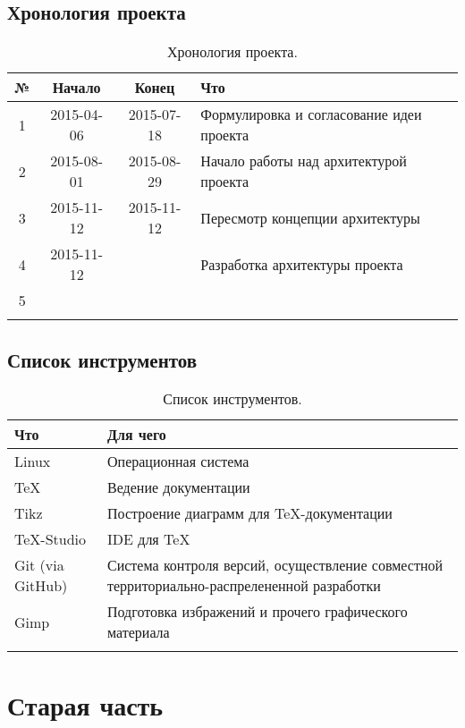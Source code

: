 \documentclass[12pt,a4paper,fullpage,titlepage]{article}
\begin{document}
\subsection{Хронология проекта}
\begin{table}[h]
\begin{tabularx}{\textwidth}{|c|c|c|X|}
	\hline
	№ & Начало & Конец & Что\\
	\hline
	1 & 2015-04-06 & 2015-07-18 & Формулировка и согласование идеи проекта \\
	\hline
	2 & 2015-08-01 & 2015-08-29 & Начало работы над архитектурой проекта \\
	\hline
	3 & 2015-11-12 & 2015-11-12 & Пересмотр концепции архитектуры \\
	\hline
	4 & 2015-11-12 &  & Разработка архитектуры проекта\\
	\hline
	5 &  &  &  \\
	\hline
	&  &  &  \\
	\hline
\end{tabularx}
\caption{Хронология проекта.}
\end{table}

\subsection{Список инструментов}
\begin{table}[h]
	\begin{tabularx}{\textwidth}{|l|X|}
		\hline
		Что & Для чего \\
		\hline
		Linux & Операционная система\\
		\hline
		\TeX & Ведение документации\\
		\hline
		Tikz & Построение диаграмм для \TeX-документации\\
		\hline
		\TeX-Studio & IDE для \TeX \\
		\hline
		Git (via GitHub) & Система контроля версий, осуществление совместной территориально-распрелененной разработки \\
		\hline
		Gimp & Подготовка избражений и прочего графического материала \\
		\hline
		& \\
		\hline
	\end{tabularx}
	\caption{Список инструментов.}
\end{table}

\newpage

\section{Старая часть}
\end{document}
